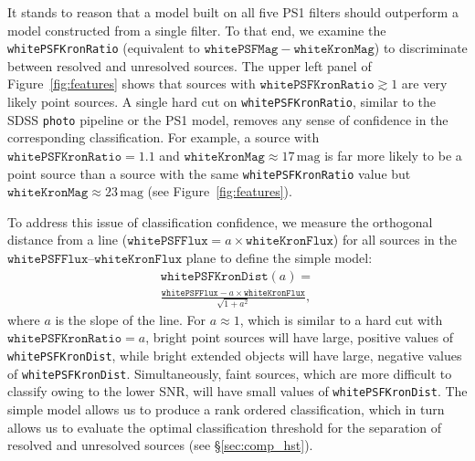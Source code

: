 \documentclass[twocolumn]{aastex62}
\begin{document}
\begin{CJK*}{UTF8}{gbsn}
It stands to reason that a model built on all five PS1 filters should
outperform a model constructed from a single filter. To that end, we examine
the \texttt{whitePSFKronRatio} (equivalent to $\mathtt{whitePSFMag} -
\mathtt{whiteKronMag}$) to discriminate between resolved and unresolved
sources. The upper left panel of Figure~\ref{fig:features} shows that
sources with $\mathtt{whitePSFKronRatio} \gtrsim 1$ are very likely point sources. A single hard cut on \texttt{whitePSFKronRatio}, similar to the SDSS
\texttt{photo} pipeline or the PS1 model, removes any sense of confidence in
the corresponding classification. For example, a source with
$\mathtt{whitePSFKronRatio} = 1.1$ and $\mathtt{whiteKronMag} \approx
17\,\mathrm{mag}$ is far more likely to be a point source than a source with the
same \texttt{whitePSFKronRatio} value but $\mathtt{whiteKronMag} \approx
23\,\mathrm{mag}$ (see Figure~\ref{fig:features}).

To address this issue of classification confidence, we measure the
orthogonal distance from a line ($\mathtt{whitePSFFlux} = a\times
\mathtt{whiteKronFlux}$) for all sources in the
$\mathtt{whitePSFFlux}$--$\mathtt{whiteKronFlux}$ plane to define the simple model:
%
\begin{multline}
 \mathtt{whitePSFKronDist}(a) = \\
 \frac{\mathtt{whitePSFFlux} - a\times\mathtt{whiteKronFlux}}{ \sqrt{1 + a^2}},
 \label{eqn:psfkrondist}
\end{multline}
%
where $a$ is the slope of the line. For $a \approx 1$, which is similar to a
hard cut with $\mathtt{whitePSFKronRatio} = a$, bright point sources will
have large, positive values of \texttt{whitePSFKronDist}, while bright
extended objects will have large, negative values of
\texttt{whitePSFKronDist}. Simultaneously, faint sources, which are more
difficult to classify owing to the lower SNR, will have small values of
\texttt{whitePSFKronDist}. The simple model allows us to produce a rank
ordered classification, which in turn allows us to evaluate the optimal
classification threshold for the separation of resolved and unresolved 
sources (see \S\ref{sec:comp_hst}).


\end{CJK*}
\end{document}
